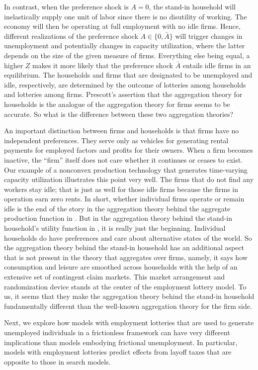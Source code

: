 In contrast, when the preference shock is $A=0$, the stand-in
household will inelastically supply one unit of labor since there
is no disutility of working. The economy will then be operating
at full employment with no idle firms. Hence, different realizations
of the preference
shock $A\in\{0,\bar A\}$ will trigger changes in unemployment
and potentially changes in capacity utilization, where the
latter depends on the size of the given measure of firms.
Everything else being equal, a higher $Z$  makes it  more likely that
the preference shock $\bar A$ entails idle firms in an equilibrium.
The households and firms
that are designated to be unemployed and idle, respectively,
are determined by the outcome of lotteries among households and
lotteries among firms. Prescott's assertion that the
aggregation theory for households is the analogue of the
aggregation theory for firms seems to be accurate. So what
is the difference between these two aggregation theories?

An important distinction between firms and households is that
firms have no independent
preferences.  They  serve only as vehicles for
generating rental payments for employed factors and profits for their owners.
When a firm becomes  inactive, the ``firm'' itself does not
care whether it continues or ceases to exist. Our
example of a nonconvex production technology that generates
time-varying capacity utilization
illustrates this point very well. The firms that do not find any workers
stay idle;  that is just as well for those idle firms because
the firms in operation earn zero rents. In short, whether individual
firms operate or remain idle is the end of the
story in the aggregation theory behind the aggregate production
function in . But in the aggregation theory behind the stand-in
household's utility function in , it is really just the beginning.
Individual households do have preferences and
care about alternative states of the world. So the aggregation theory behind
the stand-in household has an additional aspect that is not present
in the theory that aggregates over firms, namely,
it says how consumption
and leisure are smoothed  across households with the help of an
extensive set of contingent claim markets.
This market arrangement and randomization device  stands at the
center of the employment lottery model.  To us, it seems that
they make the aggregation
theory behind the stand-in household fundamentally different than
the well-known aggregation theory for the firm side.

Next, we explore how models with employment lotteries that are
used to generate unemployed individuals in a frictionless framework
can have very different implications than models embodying
frictional unemployment. In particular,
models with employment  lotteries predict effects from layoff
taxes that are
opposite to those in search models.




